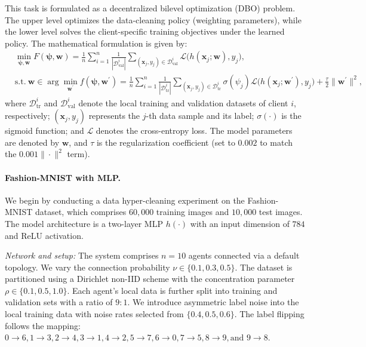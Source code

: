 \documentclass{article}
\theoremstyle{plain}
\theoremstyle{definition}
\theoremstyle{remark}
\begin{document}
This task is formulated as a decentralized bilevel optimization (DBO) problem. The upper level optimizes the data-cleaning policy (weighting parameters), while the lower level solves the client-specific training objectives under the learned policy. The mathematical formulation is given by:
\begin{equation}\label{dcrmodel}
	\begin{aligned}
		&\min_{\boldsymbol{\psi},\boldsymbol{w}} F(\boldsymbol{\psi},\boldsymbol{w}) = \frac{1}{n}\sum_{i=1}^{n}\frac{1}{|\mathcal{D}_{\mathrm{val}}^{i}|}\sum_{(\mathbf{x}_{j},y_{j})\in\mathcal{D}_{\mathrm{val}}^{i}}\mathcal{L}\big(h(\mathbf{x}_{j};\boldsymbol{w}),y_{j}\big), \\
		&\text{s.t.}\ \boldsymbol{w} \in \arg\min_{\boldsymbol{w}^{\prime}} f(\boldsymbol{\psi},\boldsymbol{w}^{\prime}) = \frac{1}{n}\sum_{i=1}^{n}\frac{1}{|\mathcal{D}_{\mathrm{tr}}^{i}|}\sum_{(\mathbf{x}_{j},y_{j})\in\mathcal{D}_{\mathrm{tr}}^{i}}\sigma(\psi_{j})\mathcal{L}\big(h(\mathbf{x}_{j};\boldsymbol{w}^{\prime}),y_{j}\big) + \frac{\tau}{2}\|\boldsymbol{w}^{\prime}\|^{2},
	\end{aligned}
\end{equation}
where $\mathcal{D}_{\mathrm{tr}}^{i}$ and $\mathcal{D}_{\mathrm{val}}^{i}$ denote the local training and validation datasets of client $i$, respectively; $(\mathbf{x}_j, y_j)$ represents the $j$-th data sample and its label; $\sigma(\cdot)$ is the sigmoid function; and $\mathcal{L}$ denotes the cross-entropy loss. The model parameters are denoted by $\boldsymbol{w}$, and $\tau$ is the regularization coefficient (set to $0.002$ to match the $0.001\|\cdot\|^2$ term).

\paragraph{Fashion-MNIST with MLP.}
We begin by conducting a data hyper-cleaning experiment on the Fashion-MNIST dataset, which comprises $60,000$ training images and $10,000$ test images. The model architecture is a two-layer MLP $h(\cdot)$ with an input dimension of $784$ and ReLU activation.


\textit{Network and setup:} The system comprises $n=10$ agents connected via a default topology. We vary the connection probability $\nu \in \{0.1, 0.3, 0.5\}$. The dataset is partitioned using a Dirichlet non-IID scheme with the concentration parameter $\rho \in \{0.1, 0.5, 1.0\}$.   Each agent's local data is further split into training and validation sets with a ratio of $9:1$. We introduce asymmetric label noise into the local training data with noise rates selected from $\{0.4, 0.5, 0.6\}$. The label flipping follows the mapping: $0{\to}6, 1{\to}3, 2{\to}4, 3{\to}1, 4{\to}2, 5{\to}7, 6{\to}0, 7{\to}5, 8{\to}9, \text{and } 9{\to}8$.
\end{document}
